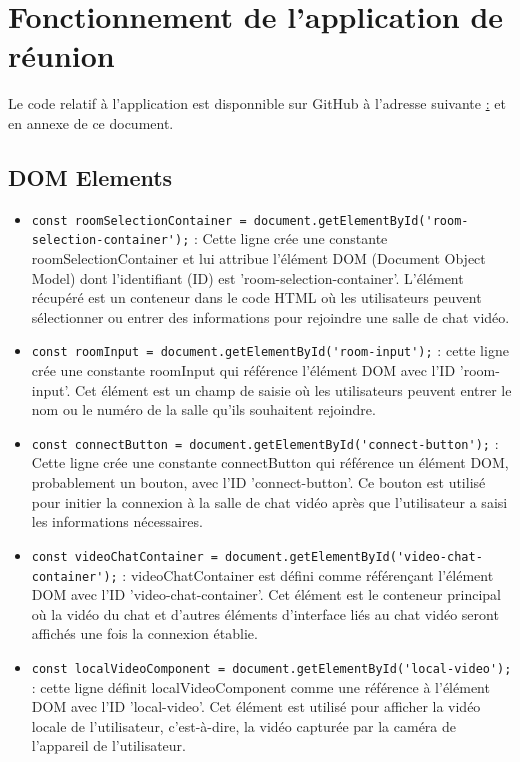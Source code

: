 \documentclass[12pt, a4paper, oneside]{thesis}
\begin{document}
\newpage

\section{Fonctionnement de l'application de réunion}

Le code relatif à l'application est disponnible sur GitHub à l'adresse suivante \href{https://github.com/mIKIII77/SAE5.ROM.03}: et en annexe de ce document.

\subsection{DOM Elements}

\begin{itemize}
  \item \verb|const roomSelectionContainer = document.getElementById('room-selection-container');| : Cette ligne crée une constante roomSelectionContainer et lui attribue l'élément DOM (Document Object Model) dont l'identifiant (ID) est 'room-selection-container'. L'élément récupéré est un conteneur dans le code HTML où les utilisateurs peuvent sélectionner ou entrer des informations pour rejoindre une salle de chat vidéo.
  \item \verb|const roomInput = document.getElementById('room-input');| : cette ligne crée une constante roomInput qui référence l'élément DOM avec l'ID 'room-input'. Cet élément est un champ de saisie où les utilisateurs peuvent entrer le nom ou le numéro de la salle qu'ils souhaitent rejoindre.
  \item \verb|const connectButton = document.getElementById('connect-button');| :  Cette ligne crée une constante connectButton qui référence un élément DOM, probablement un bouton, avec l'ID 'connect-button'. Ce bouton est utilisé pour initier la connexion à la salle de chat vidéo après que l'utilisateur a saisi les informations nécessaires.
  \item \verb|const videoChatContainer = document.getElementById('video-chat-container');| : videoChatContainer est défini comme référençant l'élément DOM avec l'ID 'video-chat-container'. Cet élément est le conteneur principal où la vidéo du chat et d'autres éléments d'interface liés au chat vidéo seront affichés une fois la connexion établie.
  \item \verb|const localVideoComponent = document.getElementById('local-video');| :  cette ligne définit localVideoComponent comme une référence à l'élément DOM avec l'ID 'local-video'. Cet élément est utilisé pour afficher la vidéo locale de l'utilisateur, c'est-à-dire, la vidéo capturée par la caméra de l'appareil de l'utilisateur.
\end{itemize}
\end{document}
